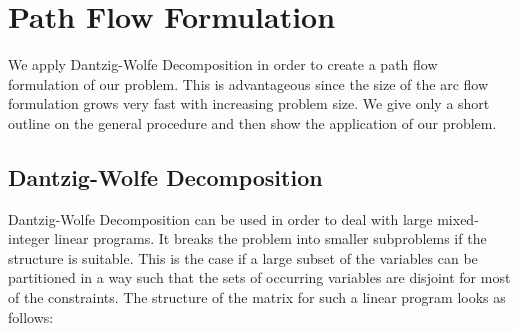 \section{Path Flow Formulation}
\label{sec:pathflow_formulation}

We apply Dantzig-Wolfe Decomposition in order to create a path flow formulation of our problem. This is advantageous since the size of the arc flow formulation grows very fast with increasing problem size. We give only a short outline on the general procedure and then show the application of our problem.

\subsection{Dantzig-Wolfe Decomposition}

Dantzig-Wolfe Decomposition can be used in order to deal with large mixed-integer linear programs. It breaks the problem into smaller subproblems if the structure is suitable. This is the case if a large subset of the variables can be partitioned in a way such that the sets of occurring variables are disjoint for most of the constraints. The structure of the matrix for such a linear program looks as follows:
